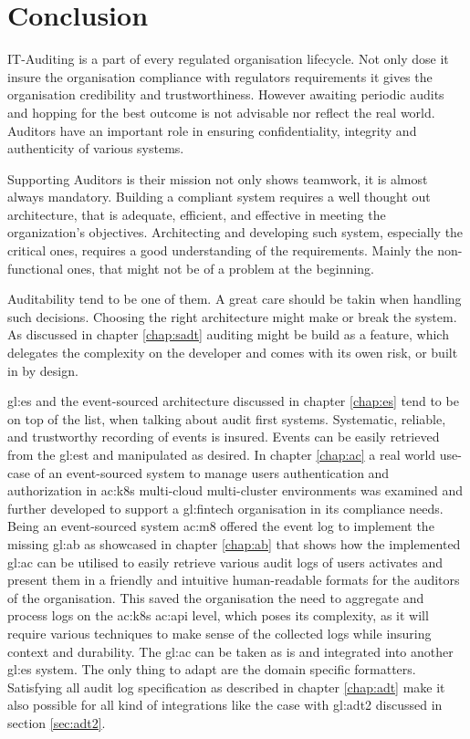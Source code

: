 %
\chapter{Conclusion}

IT-Auditing is a part of every regulated organisation lifecycle. Not only dose it insure the organisation compliance with regulators requirements it gives the organisation credibility and trustworthiness.  However awaiting periodic audits and hopping for the best outcome is not advisable nor reflect the real world. Auditors have an important role in ensuring confidentiality, integrity and authenticity of various systems.

Supporting Auditors is their mission not only shows teamwork, it is almost always mandatory. Building a compliant system requires a well thought out architecture, that is adequate, efficient, and effective in meeting the organization’s objectives. Architecting and developing such system, especially the critical ones, requires a good understanding of the requirements. Mainly the non-functional ones, that might not be of a problem at the beginning.

Auditability tend to be one of them. A great care should be takin when handling such decisions. Choosing the right architecture might make or break the system. As discussed in chapter \ref{chap:sadt} auditing might be build as a feature, which delegates the complexity on the developer and comes with its owen risk, or built in by design.

\gls{gl:es} and the event-sourced architecture discussed in chapter \ref{chap:es} tend to be on top of the list, when talking about audit first systems. Systematic, reliable, and trustworthy recording of events is insured. Events can be easily retrieved from the \gls{gl:est} and manipulated as desired. In chapter \ref{chap:ac} a real world use-case of an event-sourced system to manage users authentication and authorization in \gls{ac:k8s} multi-cloud multi-cluster environments was examined and further developed to support a \gls{gl:fintech} organisation in its compliance needs. Being an event-sourced system \gls{ac:m8} offered the event log to implement the missing \gls{gl:ab} as showcased in chapter \ref{chap:ab} that shows how the implemented \gls{gl:ac} can be utilised to easily retrieve various audit logs of users activates and present them in a friendly and intuitive human-readable formats for the auditors of the organisation. This saved the organisation the need to aggregate and process logs on the \gls{ac:k8s} \gls{ac:api} level, which poses its complexity, as it will require various techniques to make sense of the collected logs while insuring context and durability. The \gls{gl:ac} can be taken as is and integrated into another \gls{gl:es} system. The only thing to adapt are the domain specific formatters. Satisfying all audit log specification as described in chapter \ref{chap:adt} make it also possible for all kind of integrations like the case with \gls{gl:adt2} discussed in section \ref{sec:adt2}. 

